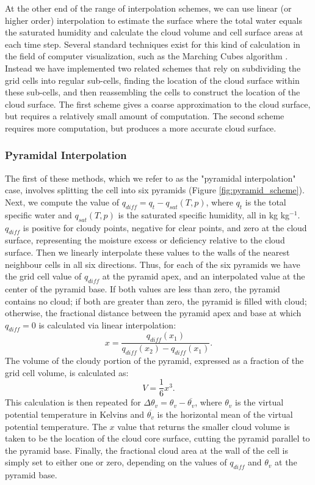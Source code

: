 \documentclass[12pt]{article}
\begin{document}
At the other end of the range of interpolation schemes, we can use linear (or 
higher order) interpolation to estimate the surface where the total water 
equals the saturated humidity and calculate the cloud volume and cell surface 
areas at each time step.  Several standard techniques exist for this kind of 
calculation in the field of computer visualization, such as the Marching 
Cubes algorithm \citep{Lorensen1987}.  Instead we have implemented two related 
schemes that rely on subdividing the grid cells into regular sub-cells, finding 
the location of the cloud surface within these sub-cells, and then reassembling 
the cells to construct the location of the cloud surface.  The first scheme 
gives a coarse approximation to the cloud surface, but requires a relatively 
small amount of computation.  The second scheme requires more computation, but 
produces a more accurate cloud surface.


\subsubsection{Pyramidal Interpolation}

The first of these methods, which we refer to as the "pyramidal interpolation" 
case, involves splitting the cell into six pyramids  
(Figure \ref{fig:pyramid_scheme}).  Next, we compute the value of 
$q_{diff} = q_t - q_{sat}(T, p)$, where $q_t$ is the total specific water and
$q_{sat}(T, p)$ is the saturated specific humidity, all in kg kg$^{-1}$.  
$q_{diff}$ is positive for cloudy points, negative for clear points, and zero 
at the cloud surface, representing the moisture excess or deficiency relative 
to the cloud surface.  Then we linearly interpolate these values to the walls 
of the nearest neighbour cells in all six directions.  Thus, for each of the 
six pyramids we have the grid cell value of $q_{diff}$ at the pyramid apex, and
an interpolated value at the center of the pyramid base. If both values are 
less than zero, the pyramid contains no cloud; if both are greater than zero, 
the pyramid is filled with cloud; otherwise, the fractional distance between 
the pyramid apex and base at which $q_{diff} = 0$ is calculated via linear 
interpolation:
\begin{equation}
\label{eq:q_diff_interpolation}
x = \frac{q_{diff}(x_1)}{q_{diff}(x_2) - q_{diff}(x_1)}.
\end{equation}
The volume of the cloudy portion of the pyramid, expressed as a fraction of the 
grid cell volume, is calculated as:
\begin{equation}
V = \frac{1}{6}x^3.
\end{equation}
This calculation is then repeated for $\Delta\theta_v = \theta_v - 
\overline{\theta_v}$, where $\theta_v$ is the virtual potential temperature in 
Kelvins and $\overline{\theta_v}$ is the horizontal mean of the virtual 
potential temperature.  The $x$ value that returns the smaller cloud volume is 
taken to be the location of the cloud core surface, cutting the pyramid 
parallel to the pyramid base.  Finally, the fractional cloud area at the wall 
of the cell is simply set to either one or zero, depending on the values of 
$q_{diff}$ and $\theta_v$ at the pyramid base.
\end{document}
